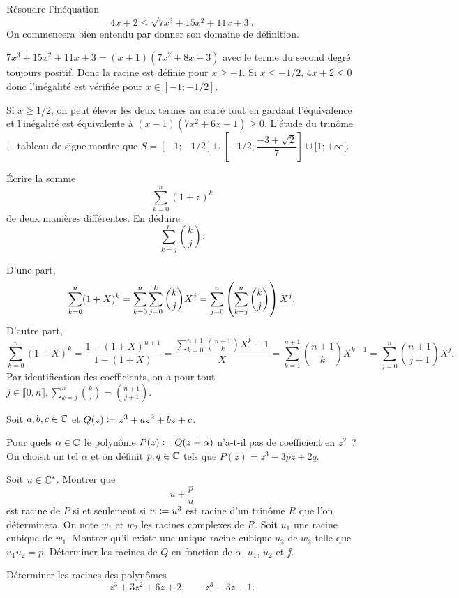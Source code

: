 \documentclass{magnolia}
\begin{document}
Résoudre l'inéquation
\[4x+2\leq\sqrt{7x^3+15x^2+11x+3}.\]
On commencera bien entendu par donner son domaine de définition.

\begin{sol}
$7x^3+15x^2+11x+3=(x+1)(7x^2+8x+3)$ avec le terme du second degré toujours positif. Donc la racine est définie pour $x\geq -1$.
Si $x\leq -1/2$, $4x+2\leq 0$ donc l'inégalité est vérifiée pour $x\in [-1;-1/2]$.

Si $x\geq 1/2$, on peut élever les deux termes au carré tout en gardant l'équivalence et l'inégalité est équivalente à $(x-1)(7x^2+6x+1)\geq 0$. L'étude du trinôme + tableau de signe montre que $S=[-1;-1/2]\cup[-1/2;\dfrac{-3+\sqrt{2}}{7}]\cup [1;+\infty[.$
\end{sol}

Écrire la somme
\[\sum_{k=0}^n (1+z)^k\]
de deux manières différentes. En déduire
\[\sum_{k=j}^n \binom{k}{j}.\]

\begin{sol}
D'une part,
$$\sum_{k=0}^n (1+X)^k=\sum_{k=0}^n \sum_{j=0}^k \binom{k}{j}X^j=\sum_{j=0}^n\left(\sum_{k=j}^n\binom{k}{j}\right)X^j.$$
D'autre part, $$\sum_{k=0}^n (1+X)^k=\frac{1-(1+X)^{n+1}}{1-(1+X)}=\frac{\sum_{k=0}^{n+1}\binom{n+1}{k}X^k -1}{X}=\sum_{k=1}^{n+1}\binom{n+1}{k}X^{k-1}=\sum_{j=0}^{n}\binom{n+1}{j+1}X^{j}.$$
Par identification des coefficients, on a pour tout $j\in \llbracket 0,n\rrbracket, \sum_{k=j}^n \binom{k}{j}=\binom{n+1}{j+1}$.
\end{sol}


Soit $a,b,c\in\mathbb{C}$ et $Q(z)\coloneqq z^3+az^2+bz+c$. 
\begin{questions}
\question Pour quels $\alpha\in\mathbb{C}$ le polynôme $P(z)\coloneqq Q(z+\alpha)$ n'a-t-il pas de coefficient en $z^2$~?
\enonce On choisit un tel $\alpha$ et on définit $p,q\in\mathbb{C}$ tels que $P(z)=z^3-3pz+2q$.
\question 
\begin{questions}
\question Soit $u\in\mathbb{C}^*$. Montrer que
  \[u+\frac{p}{u}\]
  est racine de $P$ si et seulement si $w\coloneqq u^3$ est racine d'un trinôme $R$ que l'on déterminera.
\question On note $w_1$ et $w_2$ les racines complexes de $R$. Soit $u_1$ une racine cubique de $w_1$. Montrer qu'il existe une unique racine cubique $u_2$ de $w_2$ telle que $u_1u_2=p$.
\question Déterminer les racines de $Q$ en fonction de $\alpha$, $u_1$, $u_2$ et $\jj$.
\end{questions} 
\question Déterminer les racines des polynômes
  \[z^3+3z^2+6z+2,\qquad z^3-3z-1.\]
\end{questions}
\end{document}
